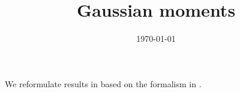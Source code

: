 \documentclass[aps,onecolumn,nofootinbib,pra]{article}
\begin{document}
    \title{Gaussian moments}

    \maketitle
    \date{\today}

    We reformulate results in \cite{goessmann_uniform_2021} based on the formalism in \cite{goessmann_tensor_2026}.

    
    
    
    

    
    
\end{document}
